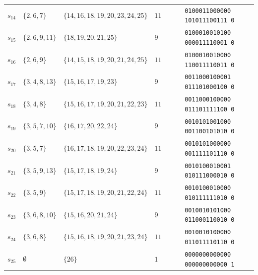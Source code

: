 \documentclass[
  aps,
  pra,
  reprint,
  superscriptaddress,
  amsmath,
  amssymb,
  nofootinbib,
  floatfix
]{revtex4-2}
\theoremstyle{definition}
\theoremstyle{remark}
\begin{document}
\begin{table}[t]
\begin{ruledtabular}
\begin{tabular}{llllc}
$s_{14}$ & $\{2,6,7\}$ & $\{14,16,18,19,20,23,24,25\}$ & $11$ & \texttt{0100011000000\,101011100111\,0} \\
$s_{15}$ & $\{2,6,9,11\}$ & $\{18,19,20,21,25\}$ & $9$ & \texttt{0100010010100\,000011110001\,0} \\
$s_{16}$ & $\{2,6,9\}$ & $\{14,15,18,19,20,21,24,25\}$ & $11$ & \texttt{0100010010000\,110011110011\,0} \\
$s_{17}$ & $\{3,4,8,13\}$ & $\{15,16,17,19,23\}$ & $9$ & \texttt{0011000100001\,011101000100\,0} \\
$s_{18}$ & $\{3,4,8\}$ & $\{15,16,17,19,20,21,22,23\}$ & $11$ & \texttt{0011000100000\,011101111100\,0} \\
$s_{19}$ & $\{3,5,7,10\}$ & $\{16,17,20,22,24\}$ & $9$ & \texttt{0010101001000\,001100101010\,0} \\
$s_{20}$ & $\{3,5,7\}$ & $\{16,17,18,19,20,22,23,24\}$ & $11$ & \texttt{0010101000000\,001111101110\,0} \\
$s_{21}$ & $\{3,5,9,13\}$ & $\{15,17,18,19,24\}$ & $9$ & \texttt{0010100010001\,010111000010\,0} \\
$s_{22}$ & $\{3,5,9\}$ & $\{15,17,18,19,20,21,22,24\}$ & $11$ & \texttt{0010100010000\,010111111010\,0} \\
$s_{23}$ & $\{3,6,8,10\}$ & $\{15,16,20,21,24\}$ & $9$ & \texttt{0010010101000\,011000110010\,0} \\
$s_{24}$ & $\{3,6,8\}$ & $\{15,16,18,19,20,21,23,24\}$ & $11$ & \texttt{0010010100000\,011011110110\,0} \\ \hline
$s_{25}$ & $\emptyset$ & $\{26\}$ & $1$ & \texttt{0000000000000\,000000000000\,1}
\end{tabular}
\end{ruledtabular}
\end{table}
\end{document}
